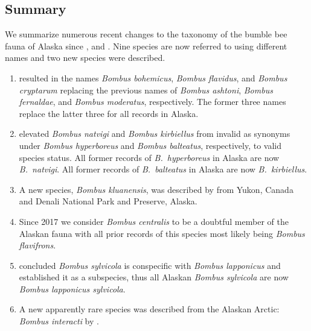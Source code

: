 \vspace{-1cm}
\begin{center}
 \parbox[t][][s]{14cm}{\section{Summary}
 We summarize numerous recent changes to the taxonomy of the bumble bee fauna of Alaska since \citet{Pampell2010, Pampell2013}, \citet{Kochetal2012} and \citet{Pampelletal2012, Pampelletal2015}. Nine species are now referred to using different names and two new species were described.

 \begin{enumerate}
\item \citet{Williamsetal2014} resulted in the names \textit{Bombus bohemicus}, \textit{Bombus flavidus}, and \textit{Bombus cryptarum} replacing the previous names of \textit{Bombus ashtoni}, \textit{Bombus fernaldae}, and \textit{Bombus moderatus}, respectively. The former three names replace the latter three for all records in Alaska.

\item \citet{Williamsetal2015} elevated \textit{Bombus natvigi} and \textit{Bombus kirbiellus} from invalid as synonyms under \textit{Bombus hyperboreus} and \textit{Bombus balteatus}, respectively, to valid species status. All former records of \textit{B.\ hyperboreus} in Alaska are now \textit{B.\ natvigi}. All former records of \textit{B.\ balteatus} in Alaska are now \textit{B.\ kirbiellus}.

\item A new species, \textit{Bombus kluanensis}, was described by \citet{Williamsetal2016} from Yukon, Canada and Denali National Park and Preserve, Alaska.

\item Since 2017 we consider \textit{Bombus centralis} to be a doubtful member of the Alaskan fauna with all prior records of this species most likely being \textit{Bombus flavifrons}. 

\item \citet{Martinetetal2019} concluded \textit{Bombus sylvicola} is conspecific with \textit{Bombus lapponicus} and established it as a subspecies, thus all Alaskan \textit{Bombus sylvicola} are now \textit{Bombus lapponicus sylvicola}.

\item A new apparently rare species was described from the Alaskan Arctic: \textit{Bombus interacti} by \citet{Martinetetal2019}.


\end{enumerate}}
\end{center}
